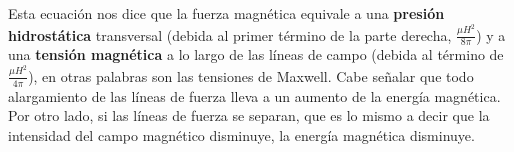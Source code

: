 Esta ecuación nos dice que la fuerza magnética equivale a una \textbf{presión hidrostática} transversal (debida al primer término de la parte derecha, $\frac{\mu H^{2}}{8\pi}$) y a una \textbf{tensión magnética} a lo largo de las líneas de campo (debida al término de $\frac{\mu H^{2}}{4\pi}$), en otras palabras son las tensiones de Maxwell.
Cabe señalar que todo alargamiento de las líneas de fuerza lleva a un aumento de la energía magnética. Por otro lado, si las líneas de fuerza se separan, que es lo mismo a decir que la intensidad del campo magnético disminuye, la energía magnética disminuye.